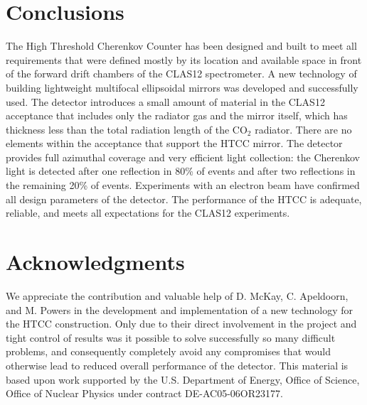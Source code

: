 \section{Conclusions}

The High Threshold Cherenkov Counter has been designed and built to meet all requirements that were defined
mostly by its location and available space in front of the forward drift chambers of the CLAS12 spectrometer. A
new technology of building lightweight multifocal ellipsoidal mirrors was developed and successfully used. The
detector introduces a small amount of material in the CLAS12 acceptance that includes only the radiator gas and the
mirror itself, which has thickness less than the total radiation length of the CO$_2$ radiator. There are no
elements within the acceptance that support the HTCC mirror. The detector provides full azimuthal coverage and
very efficient light collection: the Cherenkov light is detected after one reflection in 80\% of events and after two
reflections in the remaining 20\% of events. Experiments with an electron beam have confirmed all design
parameters of the detector. The performance of the HTCC is adequate, reliable, and meets all expectations for
the CLAS12 experiments.

\section{Acknowledgments}

We appreciate the contribution and valuable help of D. McKay, C. Apeldoorn, and M. Powers in the development and
implementation of a new technology for the HTCC construction. Only due to their direct involvement in the project
and tight control of results was it possible to solve successfully so many difficult problems, and consequently
completely avoid any compromises that would otherwise lead to reduced overall performance of the detector.
This material is based upon work supported by the U.S. Department of Energy, Office of Science, Office of Nuclear
Physics under contract DE-AC05-06OR23177.



